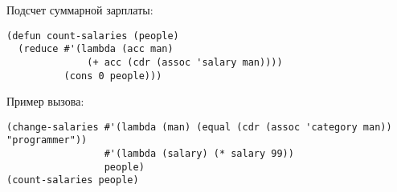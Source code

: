 Подсчет суммарной зарплаты:

\begin{lstlisting}
(defun count-salaries (people)
  (reduce #'(lambda (acc man)
              (+ acc (cdr (assoc 'salary man))))
          (cons 0 people)))
\end{lstlisting}

Пример вызова:

\begin{lstlisting}
(change-salaries #'(lambda (man) (equal (cdr (assoc 'category man)) "programmer"))
                 #'(lambda (salary) (* salary 99)) 
                 people)
(count-salaries people)
\end{lstlisting}
